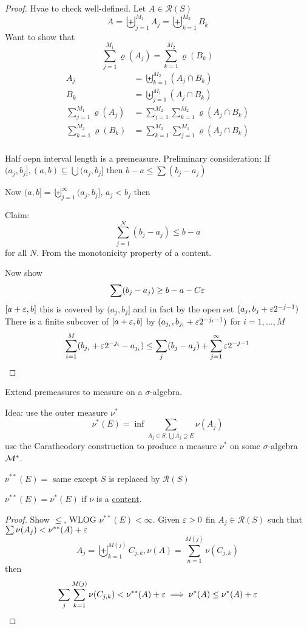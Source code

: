 \begin{proof}
  Hvae to check well-defined.  
  Let $A \in \mathcal{R}(S)$
  \[A = \biguplus_{j=1}^{M_1} A_j = \biguplus_{k=1}^{M_2} B_k \]
  Want to show that
  \[\sum_{j=1}^{M_1} \varrho(A_j) = \sum_{k=1}^{M_2} \varrho(B_k)\]
  \begin{align*}
    A_j &= \biguplus_{k=1}^{M_2} (A_j \cap B_k) \\
    B_k &= \biguplus_{j=1}^{M_1} (A_j \cap B_k) \\
    \sum_{j=1}^{M_1} \varrho(A_j) &= \sum_{j=1}^{M_2} \sum_{k=1}^{M_2} \varrho(A_j \cap B_k) \\
    \sum_{k=1}^{M_2} \varrho(B_k) &= \sum_{k=1}^{M_2} \sum_{j=1}^{M_1} \varrho(A_j \cap B_k) \\
  \end{align*}

Half oepn interval length is a premeasure.
Preliminary consideration: If $(a_j, b_j], (a, b) \subseteq \bigcup(a_j, b_j]$ then
$b-a \le \sum (b_j - a_j)$

Now $(a, b] = \biguplus_{j=1}^\infty (a_j, b_j]$, $a_j < b_j$ then 

Claim:
\[\sum_{j=1}^N (b_j - a_j) \le b-a\]
for all $N$. From the monotonicity property of a content.

Now show 
\[\sum (b_j - a_j) \ge b-a-C\varepsilon\]
$[a+\varepsilon, b]$ this is covered by $(a_j, b_j]$
and in fact by the open set $(a_j, b_j + \varepsilon 2^{-j-1})$
There is a finite subcover of $[a + \varepsilon, b]$ by $(a_{j_i}, b_{j_i} + \varepsilon 2^{-j_i-1})$ for $i = 1, \dotsc, M$
$$\sum_{i=1}^M (b_{j_i} + \varepsilon 2^{-j_i} - a_{j_i}) \le \sum_{j} (b_j - a_j) + \sum_{j=1}^\infty \varepsilon2^{-j-1}$$

\end{proof}

Extend premeasures to measure on a $\sigma$-algebra.

Idea: use the outer measure $\nu^*$
\[\nu^*(E) = \inf \sum_{A_j \in S, \bigcup A_j \supseteq E} \nu(A_j)\]
use the Caratheodory construction to produce a measure $\nu^*$ on some $\sigma$-algebra $\mathcal M^*$.

$\nu^{**}(E) = $ same except $S$ is replaced by $\mathcal{R}(S)$

\begin{claim}
  $\nu^{**}(E) = \nu^{*}(E)$
  if $\nu$ is a \underline{content}.
\end{claim}

\begin{proof}
  Show $\le$, WLOG $\nu^{**}(E) < \infty$. 
  Given $\varepsilon > 0$ fin $A_j \in \mathcal{R}(S)$ such that $\sum \nu(A_j) < \nu^{**}(A) + \varepsilon$
  \[A_j =\biguplus_{k=1}^{M(j)} C_{j, k}, \nu(A) = \sum_{n=1}^{M(j)} \nu(C_{j, k})\]
  then 
  \[\sum_j\sum_{k=1}^{M(j)} \nu(C_{j, k}) < \nu^{**}(A) + \varepsilon \implies \nu^{*}(A) \le \nu^*(A) + \varepsilon\]
\end{proof}

